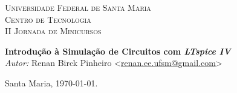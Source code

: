\begin{titlepage}
\begin{center}

\textsc{\LARGE Universidade Federal de Santa Maria}\\[1.5cm]
\textsc{\Large Centro de Tecnologia}\\[0.5cm]
\textsc{\Large II Jornada de Minicursos}\\[0.5cm]

\end{center}

\vspace*{5cm}
\begin{center}
{\huge \bfseries Introdução à Simulação de Circuitos com \textit{LTspice IV}}\\[0.4cm]
\vspace*{130px}
\emph{Autor:}
Renan Birck Pinheiro <\url{renan.ee.ufsm@gmail.com}>


Santa Maria, \today.

\end{center}




\end{titlepage}